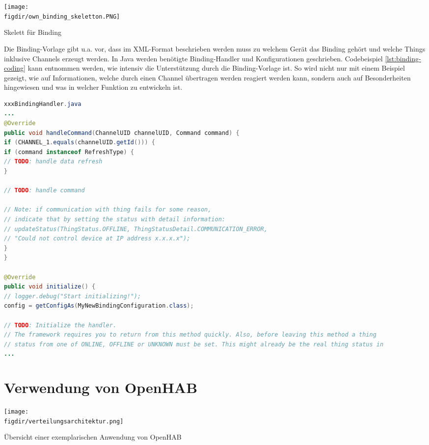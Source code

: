 {
	\centering
	\captionsetup{type=figure}
	\texttt{[image: \\figdir/own\_binding\_skeletton.PNG]}
	\caption{Skelett für Binding \label{fig:own_binding_skeleton}}
}

Die Binding-Vorlage gibt u.a. vor, dass im XML-Format beschrieben werden muss zu welchem Gerät das Binding gehört und welche Things inklusive Channels erzeugt werden. In Java werden benötigte Binding-Handler und Konfigurationen geschrieben. Codebeispiel \ref{lst:binding-coding} kann entnommen werden, wie intensiv die Unterstützung durch die Binding-Vorlage ist. So wird nicht nur mit einem Beispiel gezeigt, wie auf Informationen, welche durch einen Channel übertragen werden reagiert werden kann, sondern auch auf Besonderheiten hingewiesen und was in welcher Funktion zu entwickeln ist.


\begin{lstlisting}[language=java,firstnumber=1,caption=Handler.java Ausschnitt,label=lst:binding-coding]
xxxBindingHandler.java
...
@Override
public void handleCommand(ChannelUID channelUID, Command command) {
if (CHANNEL_1.equals(channelUID.getId())) {
if (command instanceof RefreshType) {
// TODO: handle data refresh
}

// TODO: handle command

// Note: if communication with thing fails for some reason,
// indicate that by setting the status with detail information:
// updateStatus(ThingStatus.OFFLINE, ThingStatusDetail.COMMUNICATION_ERROR,
// "Could not control device at IP address x.x.x.x");
}
}

@Override
public void initialize() {
// logger.debug("Start initializing!");
config = getConfigAs(MyNewBindingConfiguration.class);

// TODO: Initialize the handler.
// The framework requires you to return from this method quickly. Also, before leaving this method a thing
// status from one of ONLINE, OFFLINE or UNKNOWN must be set. This might already be the real thing status in
...
\end{lstlisting}


\section{Verwendung von OpenHAB}


\begin{minipage}{\textwidth}
	\centering
	\captionsetup{type=figure}
	\texttt{[image: \\figdir/verteilungsarchitektur.png]}
	\caption{Übersicht einer exemplarischen Anwendung von OpenHAB \label{fig:verteilungs-architektur}}
\end{minipage}

